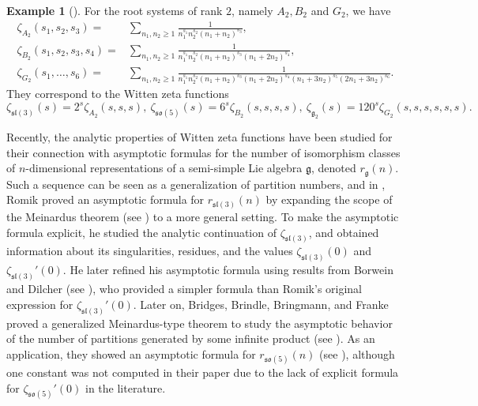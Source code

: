 \documentclass[a4paper]{amsart}
\theoremstyle{remark}
\theoremstyle{definition}
\newtheorem{example}[theorem]{Example}
\begin{document}
\begin{example}
[\cite{komori2023root}]
\label{ex:multiple_zeta_rank_2}
For the root systems of rank $2$, namely $A_2,B_2$ and $G_2$, we have
\begin{align*}
    \zeta_{A_2}(s_1,s_2,s_3) =& \sum_{n_1,n_2 \geq 1} \frac{1}{n_1^{s_1} n_2^{s_2} (n_1+n_2)^{s_3}}, \\
    \zeta_{B_2}(s_1,s_2,s_3,s_4) =& \sum_{n_1,n_2 \geq 1} \frac{1}{n_1^{s_1} n_2^{s_2} (n_1+n_2)^{s_3}(n_1+2n_2)^{s_4}}, \\
    \zeta_{G_2}(s_1,\ldots,s_6) =& \sum_{n_1,n_2 \geq 1} \frac{1}{n_1^{s_1} n_2^{s_2} (n_1+n_2)^{s_3}(n_1+2n_2)^{s_4}(n_1+3n_2)^{s_5}(2n_1+3n_2)^{s_6}}.
\end{align*}
They correspond to the Witten zeta functions
$$ \zeta_{\mathfrak{sl}(3)}(s) = 2^s \zeta_{A_2}(s,s,s), \ \zeta_{\mathfrak{so}(5)}(s) = 6^s \zeta_{B_2}(s,s,s,s), \ \zeta_{\mathfrak{g}_2}(s) = 120^{s} \zeta_{G_2}(s,s,s,s,s,s). $$
\end{example}

Recently, the analytic properties of Witten zeta functions have been studied for their connection with asymptotic formulas for the number of isomorphism classes of $n$-dimensional representations of a semi-simple Lie algebra $\mathfrak{g}$, denoted $r_{\mathfrak{g}}(n)$. Such a sequence can be seen as a generalization of partition numbers, and in \cite{romik2017representations}, Romik proved an asymptotic formula for $r_{\mathfrak{sl}(3)}(n)$ by expanding the scope of the Meinardus theorem (see \cite{andrews1976partitions}) to a more general setting. To make the asymptotic formula explicit, he studied the analytic continuation of $\zeta_{\mathfrak{sl}(3)}$, and obtained information about its singularities, residues, and the values $\zeta_{\mathfrak{sl}(3)}(0)$ and $\zeta_{\mathfrak{sl}(3)}'(0)$. He later refined his asymptotic formula using results from Borwein and Dilcher (see \cite{borwein2018tornheim}), who provided a simpler formula than Romik's original expression for $\zeta_{\mathfrak{sl}(3)}'(0)$. Later on, Bridges, Brindle, Bringmann, and Franke proved a generalized Meinardus-type theorem to study the asymptotic behavior of the number of partitions generated by some infinite product (see \cite[Theorem 4.4]{bridges2024asymptotic}). As an application, they showed an asymptotic formula for $r_{\mathfrak{so}(5)}(n)$ (see \cite[Theorem 1.3]{bridges2024asymptotic}), although one constant was not computed in their paper due to the lack of explicit formula for $\zeta_{\mathfrak{so}(5)}'(0)$ in the literature.
\end{document}
